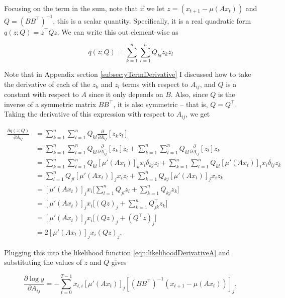\documentclass{article}
\theoremstyle{definition}
\begin{document}
Focusing on the term in the sum, note that if we let $z = (x_{t+1} - \mu(Ax_t))$ and $Q = (BB^\top)^{-1}$, this is a scalar quantity. Specifically, it is a real quadratic form $q(z; Q) = z^\top Q z$. We can write this out element-wise as

\[
q(z; Q) = \sum_{k=1}^{n} \sum_{l=1}^{n} Q_{kl} z_k z_l
\]

Note that in Appendix section \ref{subsec:yTermDerivative} I discussed how to take the derivative of each of the $z_k$ and $z_l$ terms with respect to $A_{ij}$, and $Q$ is a constant with respect to $A$ since it only depends on $B$. Also, since $Q$ is the inverse of a symmetric matrix $BB^\top$, it is also symmetric -- that is, $Q=Q^\top$. Taking the derivative of this expression with respect to $A_{ij}$, we get

\begin{equation}
    \begin{split}
    \frac{\partial q(z; Q)}{\partial A_{ij}} & = \sum_{k=1}^{n} \sum_{l=1}^{n} Q_{kl} \frac{\partial}{\partial A_{ij}} [z_k z_l] \\
    & = \sum_{k=1}^{n} \sum_{l=1}^{n} Q_{kl} \frac{\partial}{\partial A_{ij}} [z_k] z_l+ \sum_{k=1}^{n} \sum_{l=1}^{n} Q_{kl} \frac{\partial}{\partial A_{ij}} [z_l] z_k \\
    &= \sum_{k=1}^{n} \sum_{l=1}^{n} Q_{kl} [\mu'(Ax_t)]_k x_i \delta_{kj} z_l + \sum_{k=1}^{n} \sum_{l=1}^{n} Q_{kl} [\mu'(Ax_t)]_l x_i \delta_{lj} z_k \\ 
    & = \sum_{l=1}^{n} Q_{jl} [\mu'(Ax_t)]_j x_i z_l + \sum_{k=1}^{n}  Q_{kj} [\mu'(Ax_t)]_j x_i z_k \\ 
    & =  [\mu'(Ax_t)]_j x_i \big[\sum_{l=1}^{n} Q_{jl} z_l +  \sum_{k=1}^{n}  Q_{kj} z_k \big] \\ 
    & = [\mu'(Ax_t)]_j x_i \big[(Qz)_j +  \sum_{k=1}^{n}  Q^\top_{jk} z_k \big] \\ 
    & = [\mu'(Ax_t)]_j x_i \big[(Qz)_j +  (Q^\top z)_j \big] \\ 
    & = 2 [\mu'(Ax_t)]_j x_i (Qz)_j.
\end{split}
\end{equation}

Plugging this into the likelihood function \ref{eqn:likelihoodDerivativeA} and substituting the values of $z$ and $Q$ gives

\begin{equation}
    \label{eqn:gradAElementWise}
    \frac{\partial \log y}{\partial A_{ij}} = - \sum_{t=0}^{T-1} x_{t,i} [\mu'(Ax_t)]_j [(BB^\top)^{-1} (x_{t+1} - \mu(Ax_t))]_j,
\end{equation}
\end{document}
